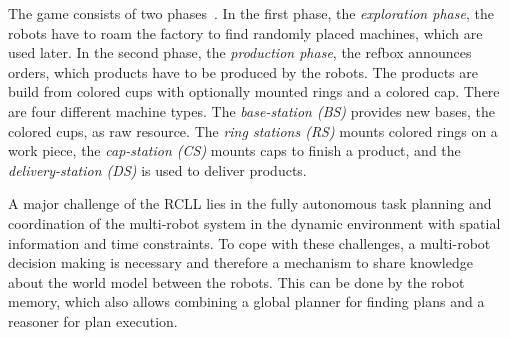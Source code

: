 \documentclass[a4paper,11pt]{article}
\newcommand{\reffig}[1]{Figure~\ref{#1}}
\begin{document}
The game consists of two phases~\cite{LLSF-Rules-2015}. In the first
phase, the \emph{exploration phase}, the robots have to roam the
factory to find randomly placed machines, which are used later.
%
In the second phase, the \emph{production phase}, the refbox announces
orders, which products have to be produced by the robots. The products
are build from colored cups with optionally mounted rings and a
colored cap.
There are four different machine types. The \emph{base-station (BS)}
provides new bases, the colored cups, as raw resource. The \emph{ring
  stations (RS)} mounts colored rings on a work piece,
the \emph{cap-station (CS)} mounts
caps to finish a product, and
the \emph{delivery-station (DS)} is used to deliver products.

A major challenge of the RCLL lies in the fully autonomous task
planning and coordination of the multi-robot system in the dynamic
environment with spatial information and time constraints.
To cope with these challenges, a
multi-robot decision making is necessary and therefore a mechanism to
share knowledge about the world model between the robots. This can be
done by the robot memory, which also allows combining a global planner
for finding plans and a reasoner for plan execution.
\end{document}
